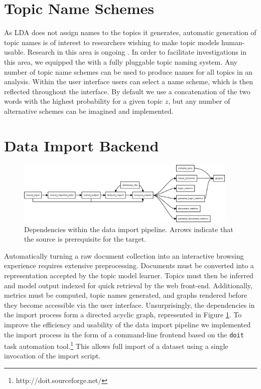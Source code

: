 \documentclass[11pt]{article}
\begin{document}

\section{Topic Name Schemes}
As LDA does not assign names to the topics it generates, automatic generation of
topic names is of interest to researchers wishing to make topic models
human-usable. Research in this area is ongoing \cite{Mei2007,Lau2010}. In order to
facilitate investigations in this area, we equipped the \tool{} with a
fully pluggable topic naming system. Any number of topic name schemes can be
used to produce names for all topics in an analysis. Within the user interface
users can select a name scheme, which is then reflected throughout the
interface. By default we use a concatenation of the two
words with the highest probability for a given topic $z$, but any number of
alternative schemes can be imagined and implemented.%

\section{Data Import Backend}
\begin{figure}[t]
 \centering
 \includegraphics[width=400px,keepaspectratio=true]{./build_flowchart.png}
 \caption{Dependencies within the data import pipeline. Arrows indicate that the source is prerequisite for the target.}
 \label{fig:build_flowchart}
\end{figure}

Automatically turning a raw document collection into an interactive browsing
experience requires extensive preprocessing. Documents must be converted into a
representation accepted by the topic model learner. Topics must then be inferred
and model output indexed for quick retrieval by the web front-end.
Additionally, metrics must be computed, topic names generated, and graphs rendered
before they become accessible via the user interface. Unsurprisingly, the dependencies
in the import process form a directed acyclic graph, represented in Figure \ref{fig:build_flowchart}. To
improve the efficiency and usability of the data import pipeline we implemented
the import process in the form of a command-line frontend based on the \texttt{doit}
task automation tool.\footnote{http://doit.sourceforge.net/} This allows full
import of a dataset using a single invocation of the import script.
\end{document}
